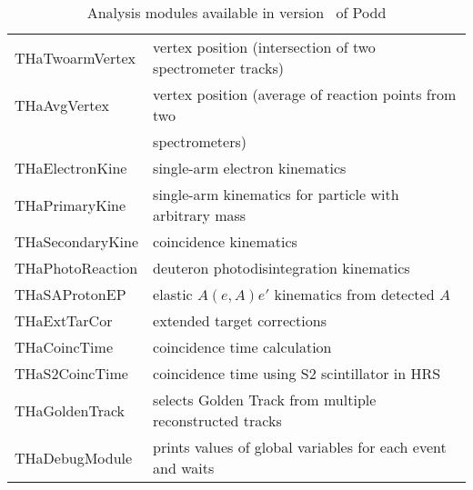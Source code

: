 {{\begin{table}[p]
\begin{tabular}{|l|l|}
THaTwoarmVertex  & vertex position (intersection of two spectrometer tracks) \\
THaAvgVertex     & vertex position (average of reaction points from two \\
                 & spectrometers) \\
THaElectronKine  & single-arm electron kinematics \\
THaPrimaryKine   & single-arm kinematics for particle with arbitrary mass \\
THaSecondaryKine & coincidence kinematics \\
THaPhotoReaction & deuteron photodisintegration kinematics \\
THaSAProtonEP    & elastic $A(e,A)e'$ kinematics from detected $A$ \\
THaExtTarCor     & extended target corrections \\
THaCoincTime     & coincidence time calculation \\
THaS2CoincTime   & coincidence time using S2 scintillator in HRS \\
THaGoldenTrack   & selects Golden Track from multiple reconstructed tracks \\
THaDebugModule   & prints values of global variables for each event and waits\\
\hline
\end{tabular}
\caption{Analysis modules available in version \cppaver\ of Podd}
\label{offl:tab:modules}
\end{table}


} %


}
